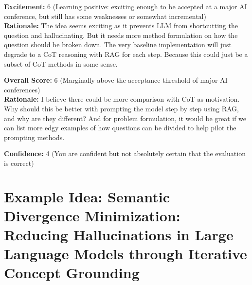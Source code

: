\begin{tcolorbox}[colback=green!10!white, colframe=green!80!black, title=\textbf{Reviewer 3}]
\textbf{Excitement:} 6 (Learning positive: exciting enough to be accepted at a major AI conference, but still has some weaknesses or somewhat incremental)\\
\textbf{Rationale:} The idea seems exciting as it prevents LLM from shortcutting the question and hallucinating. But it needs more method formulation on how the question should be broken down. The very baseline implementation will just degrade to a CoT reasoning with RAG for each step. Because this could just be a subset of CoT methods in some sense.

\vspace{10pt}

\textbf{Overall Score:} 6 (Marginally above the acceptance threshold of major AI conferences)\\
\textbf{Rationale:} I believe there could be more comparison with CoT as motivation. Why should this be better with prompting the model step by step using RAG, and why are they different? And for problem formulation, it would be great if we can list more edgy examples of how questions can be divided to help pilot the prompting methods.

\vspace{10pt}

\textbf{Confidence:} 4 (You are confident but not absolutely certain that the evaluation is correct)
\end{tcolorbox}



\newpage 




\section{Example Idea:  Semantic Divergence Minimization: Reducing Hallucinations in Large Language Models through Iterative Concept Grounding}
\label{sec:example_6}

